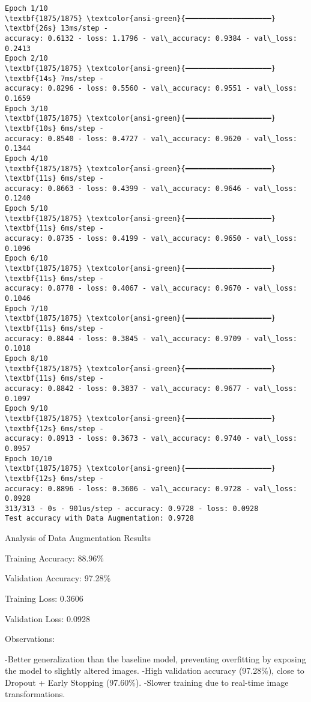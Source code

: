 \documentclass[11pt]{article}
\begin{document}
    \begin{Verbatim}[commandchars=\\\{\}]
Epoch 1/10
\textbf{1875/1875} \textcolor{ansi-green}{━━━━━━━━━━━━━━━━━━━━} \textbf{26s} 13ms/step -
accuracy: 0.6132 - loss: 1.1796 - val\_accuracy: 0.9384 - val\_loss: 0.2413
Epoch 2/10
\textbf{1875/1875} \textcolor{ansi-green}{━━━━━━━━━━━━━━━━━━━━} \textbf{14s} 7ms/step -
accuracy: 0.8296 - loss: 0.5560 - val\_accuracy: 0.9551 - val\_loss: 0.1659
Epoch 3/10
\textbf{1875/1875} \textcolor{ansi-green}{━━━━━━━━━━━━━━━━━━━━} \textbf{10s} 6ms/step -
accuracy: 0.8540 - loss: 0.4727 - val\_accuracy: 0.9620 - val\_loss: 0.1344
Epoch 4/10
\textbf{1875/1875} \textcolor{ansi-green}{━━━━━━━━━━━━━━━━━━━━} \textbf{11s} 6ms/step -
accuracy: 0.8663 - loss: 0.4399 - val\_accuracy: 0.9646 - val\_loss: 0.1240
Epoch 5/10
\textbf{1875/1875} \textcolor{ansi-green}{━━━━━━━━━━━━━━━━━━━━} \textbf{11s} 6ms/step -
accuracy: 0.8735 - loss: 0.4199 - val\_accuracy: 0.9650 - val\_loss: 0.1096
Epoch 6/10
\textbf{1875/1875} \textcolor{ansi-green}{━━━━━━━━━━━━━━━━━━━━} \textbf{11s} 6ms/step -
accuracy: 0.8778 - loss: 0.4067 - val\_accuracy: 0.9670 - val\_loss: 0.1046
Epoch 7/10
\textbf{1875/1875} \textcolor{ansi-green}{━━━━━━━━━━━━━━━━━━━━} \textbf{11s} 6ms/step -
accuracy: 0.8844 - loss: 0.3845 - val\_accuracy: 0.9709 - val\_loss: 0.1018
Epoch 8/10
\textbf{1875/1875} \textcolor{ansi-green}{━━━━━━━━━━━━━━━━━━━━} \textbf{11s} 6ms/step -
accuracy: 0.8842 - loss: 0.3837 - val\_accuracy: 0.9677 - val\_loss: 0.1097
Epoch 9/10
\textbf{1875/1875} \textcolor{ansi-green}{━━━━━━━━━━━━━━━━━━━━} \textbf{12s} 6ms/step -
accuracy: 0.8913 - loss: 0.3673 - val\_accuracy: 0.9740 - val\_loss: 0.0957
Epoch 10/10
\textbf{1875/1875} \textcolor{ansi-green}{━━━━━━━━━━━━━━━━━━━━} \textbf{12s} 6ms/step -
accuracy: 0.8896 - loss: 0.3606 - val\_accuracy: 0.9728 - val\_loss: 0.0928
313/313 - 0s - 901us/step - accuracy: 0.9728 - loss: 0.0928
Test accuracy with Data Augmentation: 0.9728
    \end{Verbatim}

    Analysis of Data Augmentation Results

Training Accuracy: 88.96\%

Validation Accuracy: 97.28\%

Training Loss: 0.3606

Validation Loss: 0.0928

Observations:

-Better generalization than the baseline model, preventing overfitting
by exposing the model to slightly altered images. -High validation
accuracy (97.28\%), close to Dropout + Early Stopping (97.60\%). -Slower
training due to real-time image transformations.
\end{document}
